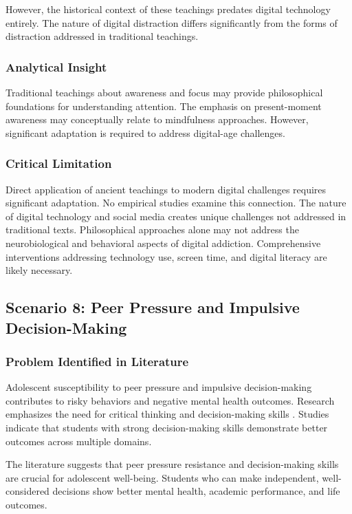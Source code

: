 \documentclass[12pt,a4paper,twocolumn]{article}
\begin{document}
However, the historical context of these teachings predates digital technology entirely. The nature of digital distraction differs significantly from the forms of distraction addressed in traditional teachings.

\subsubsection{Analytical Insight}

Traditional teachings about awareness and focus may provide philosophical foundations for understanding attention. The emphasis on present-moment awareness may conceptually relate to mindfulness approaches. However, significant adaptation is required to address digital-age challenges.

\subsubsection{Critical Limitation}

Direct application of ancient teachings to modern digital challenges requires significant adaptation. No empirical studies examine this connection. The nature of digital technology and social media creates unique challenges not addressed in traditional texts. Philosophical approaches alone may not address the neurobiological and behavioral aspects of digital addiction. Comprehensive interventions addressing technology use, screen time, and digital literacy are likely necessary.

\subsection{Scenario 8: Peer Pressure and Impulsive Decision-Making}

\subsubsection{Problem Identified in Literature}

Adolescent susceptibility to peer pressure and impulsive decision-making contributes to risky behaviors and negative mental health outcomes. Research emphasizes the need for critical thinking and decision-making skills \citep{Sharma2017}. Studies indicate that students with strong decision-making skills demonstrate better outcomes across multiple domains.

The literature suggests that peer pressure resistance and decision-making skills are crucial for adolescent well-being. Students who can make independent, well-considered decisions show better mental health, academic performance, and life outcomes.
\end{document}
